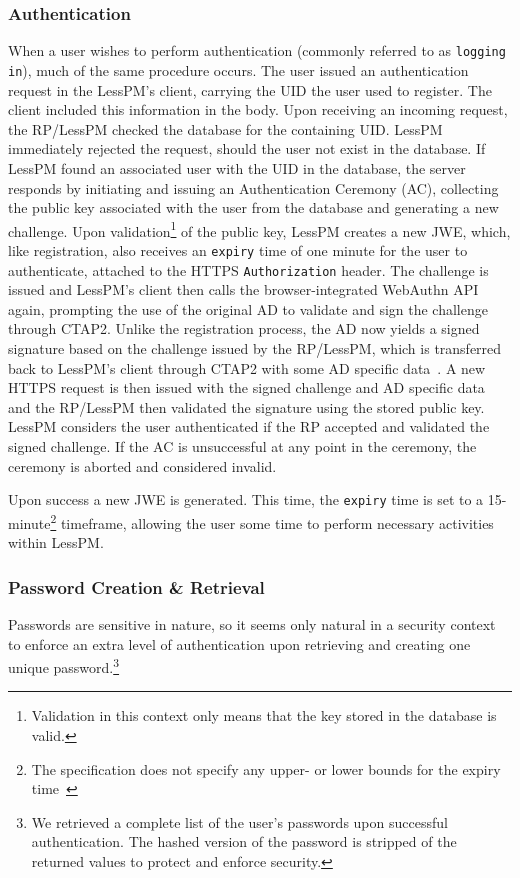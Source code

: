 \subsubsection{Authentication}\label{subsubsec:metho-authentication}
When a user wishes to perform authentication (commonly referred to as
\texttt{logging in}), much of the same procedure occurs.
The user issued an authentication request in the LessPM's client, carrying
the UID the user used to register.
The client included this information in the body.
Upon receiving an incoming request, the RP/LessPM checked the database for
the containing UID\@.
LessPM immediately rejected the request, should the user not exist in the
database.
If LessPM found an associated user with the UID in the database, the server
responds by initiating and issuing an Authentication Ceremony (AC),
collecting the public key associated with the user from the database and
generating a new challenge.
Upon validation\footnote{
  Validation in this context only means that the key stored in the database
  is valid.
} of the public key, LessPM creates a new JWE, which, like registration, also
receives an \texttt{expiry} time of one minute for the user to authenticate,
attached to the HTTPS \texttt{Authorization} header.
The challenge is issued and LessPM's client then calls the
browser-integrated WebAuthn API again, prompting the use of the original AD
to validate and sign the challenge through CTAP2.
Unlike the registration process, the AD now yields a signed signature based
on the challenge issued by the RP/LessPM\@, which is transferred back to
LessPM's client through CTAP2 with some AD specific
data~\cite{webauthn_authenticator_data}.
A new HTTPS request is then issued with the signed challenge and AD specific
data and the RP/LessPM then validated the signature using the stored public
key.
LessPM considers the user authenticated if the RP accepted and validated the
signed challenge.
If the AC is unsuccessful at any point in the ceremony, the ceremony is
aborted and considered invalid.

Upon success a new JWE is generated.
This time, the \texttt{expiry} time is set to a 15-minute\footnote{
  The specification does not specify any upper- or lower bounds for the
  expiry time~\cite{RFC7519}
} timeframe, allowing the user some time to perform necessary activities
within LessPM\@.


\subsubsection{Password Creation \& Retrieval}\label{subsubsec:creation-and-retrieval}
Passwords are sensitive in nature, so it seems only natural in a security
context to enforce an extra level of authentication upon retrieving and creating
one unique password.\footnote{
  We retrieved a complete list of the user's passwords upon successful authentication.
  The hashed version of the password is stripped of the returned values to protect and enforce security.
}

